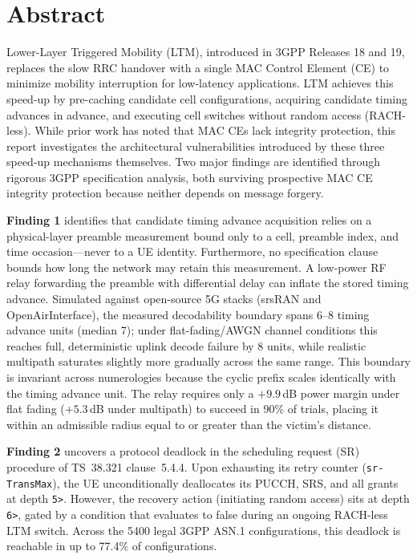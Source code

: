 \chapter*{Abstract}
\vspace{0.2em}
{\singlespacing
\noindent
Lower-Layer Triggered Mobility (LTM), introduced in 3GPP Releases 18 and 19, replaces the slow RRC
handover with a single MAC Control Element (CE) to minimize mobility interruption for low-latency
applications. LTM achieves this speed-up by pre-caching candidate cell configurations, acquiring
candidate timing advances in advance, and executing cell switches without random access (RACH-less).
While prior work has noted that MAC CEs lack integrity protection, this report investigates the
architectural vulnerabilities introduced by these three speed-up mechanisms themselves. Two major
findings are identified through rigorous 3GPP specification analysis, both surviving prospective MAC CE
integrity protection because neither depends on message forgery.

\textbf{Finding 1} identifies that candidate timing advance acquisition relies on a physical-layer preamble
measurement bound only to a cell, preamble index, and time occasion---never to a UE identity. Furthermore,
no specification clause bounds how long the network may retain this measurement. A low-power RF relay
forwarding the preamble with differential delay can inflate the stored timing advance. Simulated against
open-source 5G stacks (srsRAN and OpenAirInterface), the measured decodability boundary spans 6--8
timing advance units (median 7); under flat-fading/AWGN channel conditions this reaches full, deterministic
uplink decode failure by 8 units, while realistic multipath saturates slightly more gradually across the
same range. This boundary is invariant across numerologies because the cyclic prefix scales identically
with the timing advance unit. The relay requires only a $+9.9$\,dB power margin under flat fading
($+5.3$\,dB under multipath) to succeed in 90\% of trials, placing it within an admissible radius equal
to or greater than the victim's distance.

\textbf{Finding 2} uncovers a protocol deadlock in the scheduling request (SR) procedure of TS~38.321
clause~5.4.4. Upon exhausting its retry counter (\texttt{sr-TransMax}), the UE unconditionally deallocates
its PUCCH, SRS, and all grants at depth \texttt{5>}. However, the recovery action (initiating random
access) sits at depth \texttt{6>}, gated by a condition that evaluates to false during an ongoing
RACH-less LTM switch. Across the 5400 legal 3GPP ASN.1 configurations, this deadlock is reachable in up to
77.4\% of configurations.

}
